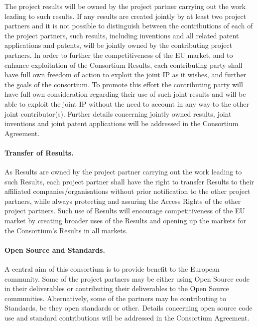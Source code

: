 \documentclass[a4paper,11pt]{article}
\begin{document}
The project results will be owned by the project partner carrying out the work leading to such results. If any results are created jointly by at least two project partners and it is not possible to distinguish between the contributions of each of the project partners, such results, including inventions and all related patent applications and patents, will be jointly owned by the contributing project partners. In order to further the competitiveness of the EU market, and to enhance exploitation of the Consortium Results, each contributing party shall have full own freedom of action to exploit the joint IP as it wishes, and further the goals of the consortium. To promote this effort the contributing party will have full own consideration regarding their use of such joint results and will be able to exploit the joint IP without the need to account in any way to the other joint contributor(s). Further details concerning jointly owned results, joint inventions and joint patent applications will be addressed in the Consortium Agreement.

\paragraph{Transfer of Results.}

As Results are owned by the project partner carrying out the work leading
to such Results, each project partner shall have the right to transfer
Results to their affiliated companies/organisations without prior notification to the
other project partners, while always protecting and assuring the Access
Rights of the other project partners.  Such use of Results will encourage
competitiveness of the EU market by creating broader uses of the Results
and opening up the markets for the Consortium's Results in all markets.

\paragraph{Open Source and Standards.}

A central aim of this consortium is to provide benefit to the European community.  Some of the project partners may be either using Open Source code in their deliverables or contributing their deliverables to the Open
Source communities. Alternatively, some of the partners may be contributing to Standards, be they open standards or other. Details concerning open source code use and standard contributions will be
addressed in the Consortium Agreement.
\end{document}
